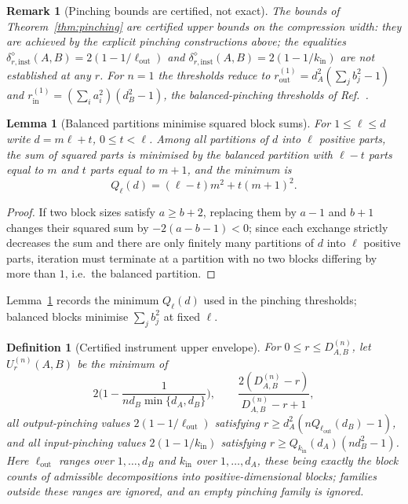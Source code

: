 \documentclass[11pt,a4paper]{article}
\newtheorem{lemma}[theorem]{Lemma}
\newtheorem{definition}[theorem]{Definition}
\newtheorem{remark}[theorem]{Remark}
\begin{document}
\begin{remark}[Pinching bounds are certified, not exact]
\label{rem:pinching-certified}
The bounds of Theorem~\ref{thm:pinching} are certified upper bounds on the compression width: they are achieved by the explicit pinching constructions above; the equalities $\delta_{r,\mathrm{inst}}^{\diamond}(A,B)=2(1-1/\ell_{\mathrm{out}})$ and $\delta_{r,\mathrm{inst}}^{\diamond}(A,B)=2(1-1/k_{\mathrm{in}})$ are not established at any $r$. For $n=1$ the thresholds reduce to $r_{\mathrm{out}}^{(1)}=d_A^2(\sum_jb_j^2-1)$ and $r_{\mathrm{in}}^{(1)}=(\sum_ia_i^2)(d_B^2-1)$, the balanced-pinching thresholds of Ref.~\cite{CompanionChannels}.
\end{remark}

\begin{lemma}[Balanced partitions minimise squared block sums]
\label{lem:balanced}
For $1\le\ell\le d$ write $d=m\ell+t$, $0\le t<\ell$. Among all partitions of $d$ into $\ell$ positive parts, the sum of squared parts is minimised by the balanced partition with $\ell-t$ parts equal to $m$ and $t$ parts equal to $m+1$, and the minimum is
\[
Q_\ell(d)=(\ell-t)m^2+t(m+1)^2.
\]
\end{lemma}

\begin{proof}
If two block sizes satisfy $a\ge b+2$, replacing them by $a-1$ and $b+1$ changes their squared sum by $-2(a-b-1)<0$; since each exchange strictly decreases the sum and there are only finitely many partitions of $d$ into $\ell$ positive parts, iteration must terminate at a partition with no two blocks differing by more than $1$, i.e.\ the balanced partition.
\end{proof}

Lemma~\ref{lem:balanced} records the minimum $Q_\ell(d)$ used in the pinching thresholds; balanced blocks minimise $\sum_jb_j^2$ at fixed $\ell$.

\begin{definition}[Certified instrument upper envelope]
\label{def:upper}
For $0\le r\le D_{A,B}^{(n)}$, let $U_r^{(n)}(A,B)$ be the minimum of
\[
2\Big(1-\frac1{nd_B\min\{d_A,d_B\}}\Big),\qquad
\frac{2(D_{A,B}^{(n)}-r)}{D_{A,B}^{(n)}-r+1},
\]
all output-pinching values $2(1-1/\ell_{\mathrm{out}})$ satisfying $r\ge d_A^2(nQ_{\ell_{\mathrm{out}}}(d_B)-1)$, and all input-pinching values $2(1-1/k_{\mathrm{in}})$ satisfying $r\ge Q_{k_{\mathrm{in}}}(d_A)(nd_B^2-1)$. Here $\ell_{\mathrm{out}}$ ranges over $1,\dots,d_B$ and $k_{\mathrm{in}}$ over $1,\dots,d_A$, these being exactly the block counts of admissible decompositions into positive-dimensional blocks; families outside these ranges are ignored, and an empty pinching family is ignored.
\end{definition}
\end{document}
